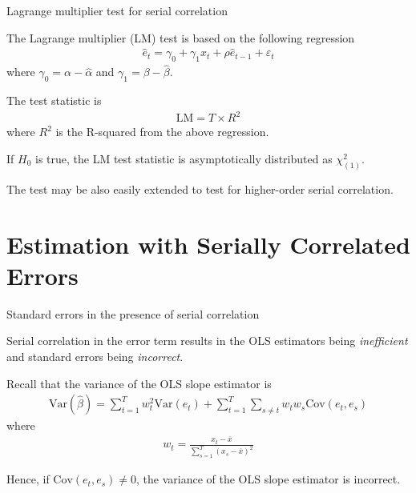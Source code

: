 \documentclass[10pt,aspectratio=169]{beamer}  %
\begin{document}

\begin{frame}{Lagrange multiplier test for serial correlation}

    \bigskip
    The Lagrange multiplier (LM) test is based on the following regression
    \begin{align*}
        \widehat{e}_{t} = \gamma_{0} + \gamma_{1} x_{t} + \rho \widehat{e}_{t-1} + \varepsilon_{t}
    \end{align*}
    where $ \gamma_{0} = \alpha - \widehat{\alpha} $ and $ \gamma_{1} = \beta - \widehat{\beta} $.

    \medskip
    The test statistic is
    \begin{align*}
        \mathrm{LM} = T \times R^2
    \end{align*}
    where $ R^2 $ is the R-squared from the above regression.

    \medskip
    If $ H_{0} $ is true, the LM test statistic is asymptotically distributed as $ \chi^2_{(1)} $.

    \medskip
    The test may be also easily extended to test for higher-order serial correlation.

\end{frame}


\section{Estimation with Serially Correlated Errors}


\begin{frame}{Standard errors in the presence of serial correlation}

    \bigskip
    Serial correlation in the error term results in the OLS estimators being \textit{inefficient} and standard errors being \textit{incorrect}.

    \medskip
    Recall that the variance of the OLS slope estimator is
    \begin{align*}
        \mathrm{Var}(\widehat{\beta}) = \sum_{t=1}^{T} w_{t}^2 \mathrm{Var}(e_{t}) + \sum_{t=1}^{T} \sum_{s \neq t} w_{t} w_{s} \mathrm{Cov}(e_{t}, e_{s})
    \end{align*}
    where
    \begin{align*}
        w_{t} = \frac{x_{t} - \overline{x}}{\sum_{s=1}^{T} (x_{s} - \overline{x})^2}
    \end{align*}

    Hence, if $ \mathrm{Cov}(e_{t}, e_{s}) \neq 0 $, the variance of the OLS slope estimator is incorrect.

\end{frame}
\end{document}

